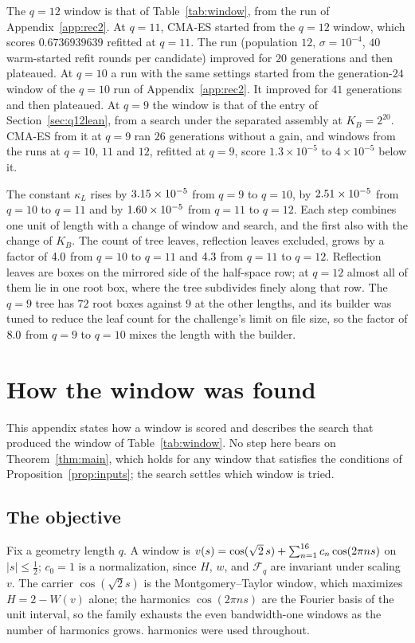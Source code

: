 \documentclass[11pt]{article}
\theoremstyle{definition}
\newcommand{\Fr}{\mathcal{F}}
\begin{document}
The $q=12$ window is that of Table~\ref{tab:window}, from the run of
Appendix~\ref{app:rec2}. At $q=11$, CMA-ES started from the $q=12$
window, which scores $0.6736939639$ refitted at $q=11$. The run
(population $12$, $\sigma=10^{-4}$, $40$ warm-started refit rounds per
candidate) improved for $20$ generations and then plateaued. At $q=10$ a run with the same settings started from the
generation-$24$ window of the $q=10$ run of Appendix~\ref{app:rec2}. It improved for $41$
generations and then plateaued. At $q=9$ the window is that of the entry of Section~\ref{sec:q12lean},
from a search under the separated assembly at $K_B=2^{20}$. CMA-ES
from it at $q=9$ ran $26$ generations without a gain, and windows from the
runs at $q=10$, $11$ and $12$, refitted at $q=9$, score $1.3\times10^{-5}$ to
$4\times10^{-5}$ below it.

The constant $\kappa_L$ rises by $3.15\times10^{-5}$ from $q=9$ to $q=10$, by
$2.51\times10^{-5}$ from $q=10$ to $q=11$ and by $1.60\times10^{-5}$ from
$q=11$ to $q=12$. Each step combines one unit of length with a change of window
and search, and the first also with the change of $K_B$. The count of tree
leaves, reflection leaves excluded, grows by a factor of $4.0$ from
$q=10$ to $q=11$ and $4.3$ from $q=11$ to $q=12$. Reflection
leaves are boxes on the mirrored side of the half-space row; at $q=12$ almost all
of them lie in one root box, where the tree subdivides finely along that row. The $q=9$
tree has $72$ root boxes against $9$ at the other lengths, and its builder was
tuned to reduce the leaf count for the challenge's limit on file size, so the
factor of $8.0$ from $q=9$ to $q=10$ mixes the length with the
builder.

\lenVerNote

\section{How the window was found}\label{app:prov}

This appendix states how a window is scored and describes the search that produced the window
of Table~\ref{tab:window}. No step here bears on Theorem~\ref{thm:main}, which holds for any
window that satisfies the conditions of Proposition~\ref{prop:inputs}; the search settles which
window is tried.

\subsection{The objective}\label{sec:search-objective}
Fix a geometry length $q$. A window is
$v(s)=\cos(\sqrt2\,s)+\sum_{n=1}^{16}c_n\cos(2\pi ns)$
on $|s|\le\tfrac12$; $c_0=1$ is a normalization, since $H$, $w$, and $\Fr_q$
are invariant under scaling $v$. The carrier $\cos(\sqrt2 s)$ is the
Montgomery--Taylor window, which maximizes $H=2-W(v)$ alone; the harmonics
$\cos(2\pi ns)$ are the Fourier basis of the unit interval, so the family
exhausts the even bandwidth-one windows as the number of harmonics grows.
\qNharmWordCap{} harmonics were used throughout.
\end{document}
